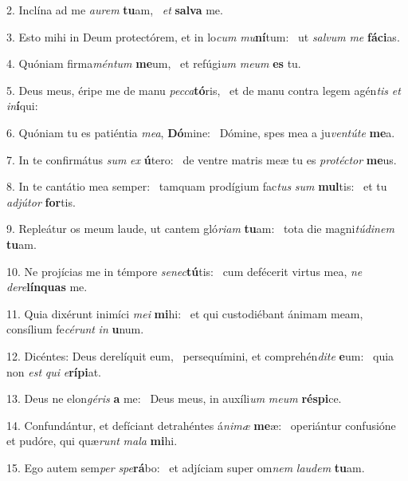 2. Inclína ad me \textit{au}\textit{rem} \textbf{tu}am, \ast\  \textit{et} \textbf{sal}\textbf{va} me.\

3. Esto mihi in Deum protectórem, et in lo\textit{cum} \textit{mu}\textbf{ní}tum: \ast\  ut \textit{sal}\textit{vum} \textit{me} \textbf{fá}\textbf{ci}as.\

4. Quóniam firma\textit{mén}\textit{tum} \textbf{me}um, \ast\  et refúgi\textit{um} \textit{me}\textit{um} \textbf{es} tu.\

5. Deus meus, éripe me de manu \textit{pec}\textit{ca}\textbf{tó}ris, \ast\  et de manu contra legem agén\textit{tis} \textit{et} \textit{in}\textbf{í}qui:\

6. Quóniam tu es patiéntia \textit{me}\textit{a}, \textbf{Dó}mine: \ast\  Dómine, spes mea a ju\textit{ven}\textit{tú}\textit{te} \textbf{me}a.\

7. In te confirmátus \textit{sum} \textit{ex} \textbf{ú}tero: \ast\  de ventre matris meæ tu es \textit{pro}\textit{téc}\textit{tor} \textbf{me}us.\

8. In te cantátio mea semper: \dag\  tamquam prodígium fac\textit{tus} \textit{sum} \textbf{mul}tis: \ast\  et tu \textit{ad}\textit{jú}\textit{tor} \textbf{for}tis.\

9. Repleátur os meum laude, ut cantem gló\textit{ri}\textit{am} \textbf{tu}am: \ast\  tota die magni\textit{tú}\textit{di}\textit{nem} \textbf{tu}am.\

10. Ne projícias me in témpore \textit{se}\textit{nec}\textbf{tú}tis: \ast\  cum defécerit virtus mea, \textit{ne} \textit{de}\textit{re}\textbf{lín}\textbf{quas} me.\

11. Quia dixérunt inimíci \textit{me}\textit{i} \textbf{mi}hi: \ast\  et qui custodiébant ánimam meam, consílium fe\textit{cé}\textit{runt} \textit{in} \textbf{u}num.\

12. Dicéntes: Deus derelíquit eum, \dag\  persequímini, et comprehén\textit{di}\textit{te} \textbf{e}um: \ast\  quia non \textit{est} \textit{qui} \textit{e}\textbf{rí}\textbf{pi}at.\

13. Deus ne elon\textit{gé}\textit{ris} \textbf{a} me: \ast\  Deus meus, in auxíli\textit{um} \textit{me}\textit{um} \textbf{ré}\textbf{spi}ce.\

14. Confundántur, et defíciant detrahéntes á\textit{ni}\textit{mæ} \textbf{me}æ: \ast\  operiántur confusióne et pudóre, qui quæ\textit{runt} \textit{ma}\textit{la} \textbf{mi}hi.\

15. Ego autem sem\textit{per} \textit{spe}\textbf{rá}bo: \ast\  et adjíciam super om\textit{nem} \textit{lau}\textit{dem} \textbf{tu}am.\

